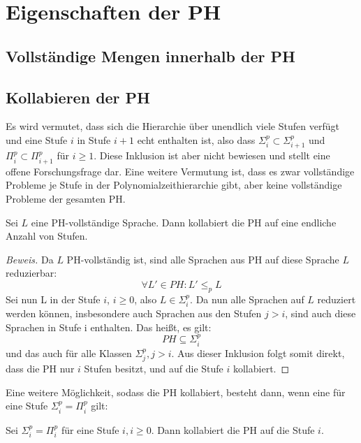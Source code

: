 \chapter{Eigenschaften der PH} \label{chapter: Eigenschaften der PH}
\section{Vollständige Mengen innerhalb der PH} \label{section: Vollständige Mengen innerhalb der PH}

\section{Kollabieren der PH} \label{section: Kollabieren der PH}
Es wird vermutet, dass sich die Hierarchie über unendlich viele Stufen verfügt und eine Stufe $i$ in Stufe $i + 1$ echt enthalten ist,
also dass $\Sigma^p_i \subset \Sigma^p_{i+1}$ und $\Pi^p_i \subset \Pi^p_{i+1}$ für $i \geq 1$. Diese Inklusion ist aber nicht bewiesen und stellt eine offene
Forschungsfrage dar. Eine weitere Vermutung ist, dass es zwar vollständige Probleme je Stufe in der Polynomialzeithierarchie gibt, aber keine vollständige Probleme der gesamten PH.
\begin{theorem}
    Sei $L$ eine PH-vollständige Sprache. Dann kollabiert die PH auf eine endliche Anzahl von Stufen. 
\end{theorem}

\begin{proof}[Beweis]
    Da $L$ PH-vollständig ist, sind alle Sprachen aus PH auf diese Sprache $L$ reduzierbar:
    $$
    \forall L' \in PH: L' \leq_p L
    $$
    Sei nun L in der Stufe $i$, $i \geq 0$, also $L \in \Sigma^p_i$. Da nun alle Sprachen auf $L$ reduziert werden können, insbesondere
    auch Sprachen aus den Stufen $j > i$, sind auch diese Sprachen in Stufe i enthalten.
    Das heißt, es gilt: 
    $$
    PH \subseteq \Sigma^p_i
    $$ 
    und das auch für alle Klassen $\Sigma^p_j, j> i$.
    Aus dieser Inklusion folgt somit direkt, dass die PH nur $i$ Stufen besitzt, und auf die Stufe $i$ kollabiert.
\end{proof}

Eine weitere Möglichkeit, sodass die PH kollabiert, besteht dann, wenn eine für eine Stufe $\Sigma^p_i = \Pi^p_i$ gilt:

\begin{theorem}
    Sei $\Sigma^p_i = \Pi^p_i$ für eine Stufe $i, i \geq 0$. Dann kollabiert die PH auf die Stufe $i$.
\end{theorem}

